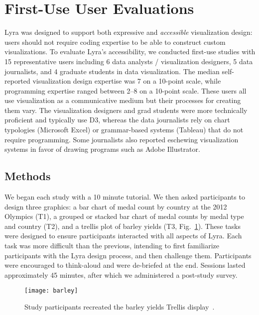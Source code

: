 \section{First-Use User Evaluations}

Lyra was designed to support both expressive and \emph{accessible}
visualization design: users should not require coding expertise to be able to
construct custom visualizations. To evaluate Lyra's accessibility, we
conducted first-use studies with 15 representative users including 6 data
analysts / visualization designers, 5 data journalists, and 4 graduate
students in data visualization. The median self-reported visualization design
expertise was 7 on a 10-point scale, while programming expertise ranged
between 2--8 on a 10-point scale. These users all use visualization as a
communicative medium but their processes for creating them vary. The
visualization designers and grad students were more technically proficient and
typically use D3, whereas the data journalists rely on chart typologies
(Microsoft Excel) or grammar-based systems (Tableau) that do not require
programming. Some journalists also reported eschewing visualization systems in
favor of drawing programs such as Adobe Illustrator.

\subsection{Methods}

We began each study with a 10 minute tutorial. We then asked participants to
design three graphics: a bar chart of medal count by country at the 2012
Olympics (T1), a grouped or stacked bar chart of medal counts by medal type and
country (T2), and a trellis plot of barley yields (T3,
Fig.~\ref{fig:lyra:trellis}). These tasks were designed to ensure participants
interacted with all aspects of Lyra. Each task was more difficult than the
previous, intending to first familiarize participants with the Lyra design
process, and then challenge them. Participants were encouraged to think-aloud
and were de-briefed at the end. Sessions lasted approximately 45 minutes, after
which we administered a post-study survey.

\begin{figure}[t!]
  \centering
  \texttt{[image: barley]}
  \caption{Study participants recreated the barley yields Trellis
  display~\cite{becker:trellis}.}
  \label{fig:lyra:trellis}
\end{figure}

